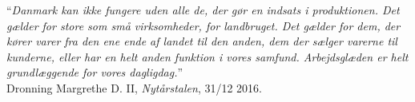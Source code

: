 


\newpage 
\begin{center}
\vspace*{2in}
“\emph{Danmark kan ikke fungere uden alle de, der gør en indsats i produktionen. Det gælder for store som små virksomheder, for landbruget. Det gælder for dem, der kører varer fra	den ene ende af landet til den anden, dem der sælger varerne til kunderne, eller har en helt anden funktion i vores samfund. Arbejdsglæden er helt grundlæggende for vores dagligdag.}” \\

\vspace{1cm}
\hfill Dronning Margrethe D. II, \emph{Nytårstalen}, 31/12 2016.
\end{center}
\newpage 





% 







\tableofcontents*		%

\newpage

\thispagestyle{empty}
 
\listoffigures
\listoftables
 
\newpage






%

